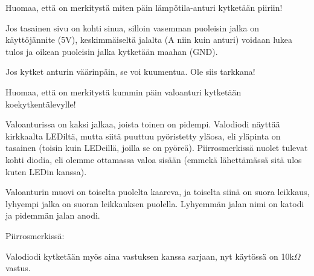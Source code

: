 \begin{tcolorbox}[title=Lämpötila-anturi,colback=blue!10,colbacktitle=purple!90]
Huomaa, että on merkitystä miten päin lämpötila-anturi kytketään piiriin! 

Jos tasainen sivu on kohti sinua, silloin vasemman puoleisin jalka on käyttöjännite (5V), keskimmäiseltä jalalta (A niin kuin anturi) voidaan lukea tulos ja oikean puoleisin jalka kytketään maahan (GND).

\begin{center}
\end{center}

Jos kytket anturin väärinpäin, se voi kuumentua. Ole siis tarkkana!
\end{tcolorbox}

\begin{tcolorbox}[title=Valoanturin kytkeminen,colback=blue!10,colbacktitle=purple!90]
Huomaa, että on merkitystä kummin päin valoanturi kytketään koekytkentälevylle! 

Valoanturissa on kaksi jalkaa, joista toinen on pidempi. Valodiodi näyttää kirkkaalta LEDiltä, mutta siitä puuttuu pyöristetty yläosa, eli yläpinta on tasainen (toisin kuin LEDeillä, joilla se on pyöreä). Piirrosmerkissä nuolet tulevat kohti diodia, eli olemme ottamassa valoa sisään (emmekä lähettämässä sitä ulos kuten LEDin kanssa). 

Valoanturin muovi on toiselta puolelta kaareva, ja toiselta siinä on suora leikkaus, lyhyempi jalka on suoran leikkauksen puolella. Lyhyemmän jalan nimi on katodi ja pidemmän jalan anodi.

Piirrosmerkissä:
\begin{center}
\end{center}

Valodiodi kytketään myös aina vastuksen kanssa sarjaan, nyt käytössä on 10k$\Omega$ vastus. 
\end{tcolorbox}

